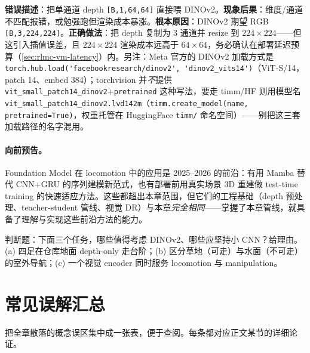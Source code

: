 \begin{pitfall}
\textbf{错误描述}：把单通道 depth \verb|[B,1,64,64]| 直接喂 DINOv2。\textbf{现象后果}：维度/通道不匹配报错，或勉强跑但渲染成本暴涨。\textbf{根本原因}：DINOv2 期望 RGB \verb|[B,3,224,224]|。\textbf{正确做法}：把 depth 复制为 $3$ 通道并 resize 到 $224\times224$——但这引入插值误差，且 $224\times224$ 渲染成本远高于 $64\times64$，务必确认在部署延迟预算（\cref{sec:rlmc-vm-latency}）内。另注：Meta 官方的 DINOv2 加载方式是 \verb|torch.hub.load('facebookresearch/dinov2', 'dinov2_vits14')|（ViT-S/14，patch 14、embed 384）；torchvision 并\emph{不}提供 \texttt{vit\_small\_patch14\_dinov2}+\texttt{pretrained} 这种写法，要走 timm/HF 则用模型名 \texttt{vit\_small\_patch14\_dinov2.lvd142m}（\verb|timm.create_model(name, pretrained=True)|，权重托管在 HuggingFace \texttt{timm/} 命名空间）——别把这三套加载路径的名字混用。
\end{pitfall}

\paragraph{向前预告。}Foundation Model 在 locomotion 中的应用是 2025--2026 的前沿：有用 Mamba 替代 CNN+GRU 的序列建模新范式，也有部署前用真实场景 3D 重建做 test-time training 的快速适应方法。这些都超出本章范围，但它们的工程基础（depth 预处理、teacher-student 管线、视觉 DR）与本章\emph{完全相同}——掌握了本章管线，就具备了理解与实现这些前沿方法的能力。

\begin{practice}
判断题：下面三个任务，哪些值得考虑 DINOv2、哪些应坚持小 CNN？给理由。(a) 四足在仓库地面 depth-only 走台阶；(b) 区分草地（可走）与水面（不可走）的室外导航；(c) 一个视觉 encoder 同时服务 locomotion 与 manipulation。
\end{practice}

\section{常见误解汇总}
\label{sec:rlmc-vm-myths}

把全章散落的概念误区集中成一张表，便于查阅。每条都对应正文某节的详细论证。

